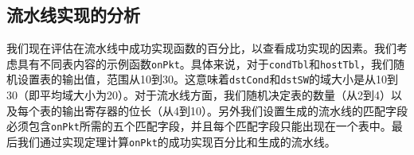 \begin{table}[t]

\vspace{2mm}
\caption{流水线的特征结果。}
\label{cap:tbl:table3}
\end{table}



\subsection{流水线实现的分析}

我们现在评估在流水线中成功实现函数的百分比，以查看成功实现的因素。我们考虑具有不同表内容的示例函数\texttt{onPkt}。具体来说，对于\texttt{condTbl}和\texttt{hostTbl}，我们随机设置表的输出值，范围从10到30。这意味着\texttt{dstCond}和\texttt{dstSW}的域大小是从10到30（即平均域大小为20）。对于流水线方面，我们随机决定表的数量（从2到4）以及每个表的输出寄存器的位长（从4到10）。另外我们设置生成的流水线的匹配字段必须包含\texttt{onPkt}所需的五个匹配字段，并且每个匹配字段只能出现在一个表中。最后我们通过实现定理计算\texttt{onPkt}的成功实现百分比和生成的流水线。



